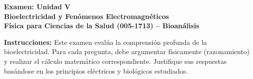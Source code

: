 \documentclass[11pt,letterpaper]{article}
\begin{document}
\begin{center}
    \textbf{\Large Examen: Unidad V}\\
    \textbf{\large Bioelectricidad y Fenómenos Electromagnéticos}\\
    \vspace{0.2cm}
    \textbf{Física para Ciencias de la Salud (005-1713) -- Bioanálisis}\\
\end{center}

\vspace{0.2cm}

\textbf{Instrucciones:} Este examen evalúa la comprensión profunda de la bioelectricidad. Para cada pregunta, debe argumentar físicamente (razonamiento) y realizar el cálculo matemático correspondiente. Justifique sus respuestas basándose en los principios eléctricos y biológicos estudiados.

\vspace{0.2cm}
\end{document}
